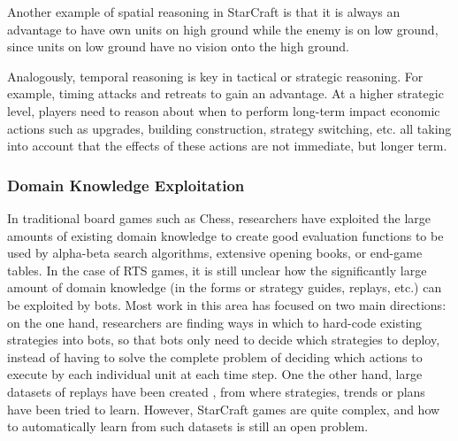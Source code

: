 \documentclass{llncs}
\begin{document}

Another example of spatial reasoning in StarCraft is that it is always
an advantage to  have own units on  high ground while the  enemy is on
low ground,  since units on  low ground have  no vision onto  the high
ground. %

Analogously,  temporal  reasoning  is  key in  tactical  or  strategic
reasoning.  For  example,  timing  attacks and  retreats  to  gain  an
advantage. At a  higher strategic level, players need  to reason about
when to  perform long-term impact  economic actions such  as upgrades,
building  construction,  strategy  switching,  etc.  all  taking  into
account  that the  effects of  these  actions are  not immediate,  but
longer term.


\subsubsection{Domain Knowledge Exploitation}
In traditional board  games such as Chess,  researchers have exploited
the  large  amounts  of  existing  domain  knowledge  to  create  good
evaluation  functions  to be  used  by  alpha-beta search  algorithms,
extensive opening books, or end-game tables. In the case of RTS games,
it  is still  unclear how  the  significantly large  amount of  domain
knowledge  (in the  forms or  strategy guides,  replays, etc.)  can be
exploited by  bots. Most  work in  this area has  focused on  two main
directions: on the one hand, researchers  are finding ways in which to
hard-code existing  strategies into  bots, so that  bots only  need to
decide  which strategies  to deploy,  instead of  having to  solve the
complete  problem  of  deciding  which  actions  to  execute  by  each
individual unit at each time step.  One the other hand, large datasets
of  replays have  been created  \cite{WeberCig09,synnaeve2012dataset},
from  where   strategies,  trends   or  plans   have  been   tried  to
learn.  However,  StarCraft  games  are  quite  complex,  and  how  to
automatically learn from such datasets is still an open problem.
\end{document}
